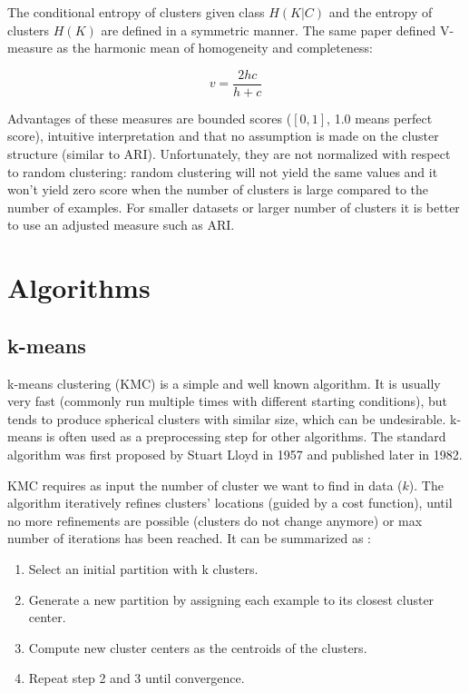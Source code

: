 \documentclass[conference]{IEEEtran}
\begin{document}
The conditional entropy of clusters given class $H(K|C)$ and the entropy of clusters $H(K)$ are
defined in a symmetric manner. The same paper defined V-measure as the harmonic mean of homogeneity and completeness:

\begin{equation}
\label{v}
v = \frac{2hc}{h+c}
\end{equation}

Advantages of these measures are bounded scores ($[0, 1]$, 1.0 means perfect score), intuitive interpretation and that
no assumption is made on the cluster structure (similar to ARI). Unfortunately, they are not normalized
with respect to random clustering: random clustering will not yield the same values and it won't
yield zero score when the number of clusters is large compared to the number of examples. For smaller
datasets or larger number of clusters it is better to use an adjusted measure such as ARI.

\section{Algorithms}
\subsection{k-means}
k-means clustering (KMC) is a simple and well known algorithm. It is usually very
fast (commonly run multiple times with different starting conditions), but tends
to produce spherical clusters with similar size, which can be undesirable.
k-means is often used as a preprocessing step for other algorithms. The standard
algorithm was first proposed by Stuart Lloyd in 1957 and published later in 1982.

KMC requires as input the number of cluster we want to find in data ($k$).
The algorithm iteratively refines clusters' locations (guided by a cost function),
until no more refinements are possible (clusters do not change anymore)
or max number of iterations has been reached. It can be summarized as \cite{jain00}:

\begin{enumerate}
    \item Select an initial partition with k clusters.
    \item Generate a new partition by assigning each example to its closest cluster center.
    \item Compute new cluster centers as the centroids of the clusters.
    \item Repeat step 2 and 3 until convergence.
\end{enumerate}
\end{document}
